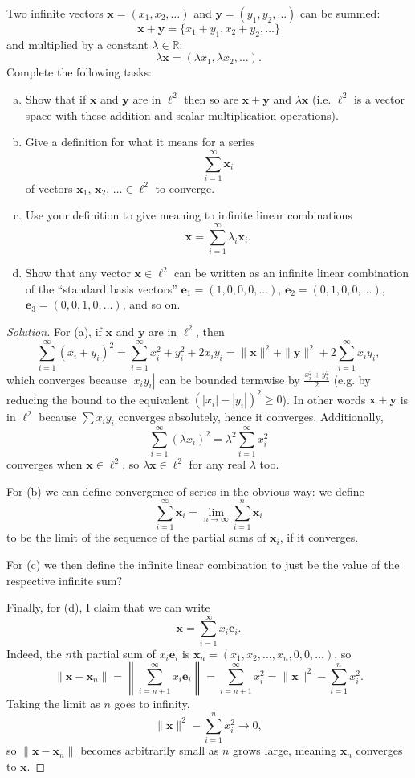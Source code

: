 \documentclass[11pt]{scrartcl}
\providecommand{\RR}{\mathbb R}
\providecommand{\ii}{\item}
\providecommand{\mb}[1]{\mathbf{#1}}
\newenvironment{soln}{\begin{proof}[Solution]}{\end{proof}}
\begin{document}
\begin{problem}
	Two infinite vectors $\mb x = (x_1, x_2, \dots)$
	and $\mb y = (y_1, y_2, \dots)$ can be summed:
	\[\mb x + \mb y = \{x_1 + y_1, x_2 + y_2, \dots\}\]
	and multiplied by a constant $\lambda\in\RR$:
	\[\lambda\mb x = (\lambda x_1, \lambda x_2, \dots).\]
	Complete the following tasks:
	\begin{enumerate}[(a)]
		\ii Show that if $\mb x$ and $\mb y$ are in $\ell^2$
		then so are $\mb x + \mb y$ and $\lambda\mb x$
		(i.e. $\ell^2$ is a vector space
		with these addition and scalar multiplication operations).
		\ii Give a definition for what it means for a series
		\[\sum_{i=1}^{\infty} \mb x_i\]
		of vectors $\mb x_1,\,\mb x_2,\,\dots\in\ell^2$ to converge.
		\ii Use your definition to give meaning to infinite linear combinations
		\[\mb x = \sum_{i=1}^\infty \lambda_i\mb x_i.\]
		\ii Show that any vector $\mb x\in\ell^2$ can be written as
		an infinite linear combination of the ``standard basis vectors''
		$\mb e_1 = (1, 0, 0, 0, \dots)$, $\mb e_2 = (0, 1, 0, 0, \dots)$,
		$\mb e_3 = (0, 0, 1, 0, \dots)$, and so on.
	\end{enumerate}
\end{problem}

\begin{soln}
	For (a), if $\mb x$ and $\mb y$ are in $\ell^2$, then
	\[\sum_{i=1}^\infty (x_i + y_i)^2 =
	\sum_{i=1}^\infty x_i^2 + y_i^2 + 2x_iy_i
	= \|\mb x\|^2 + \|\mb y\|^2 + 2\sum_{i=1}^\infty x_iy_i,\]
	which converges because $|x_iy_i|$ can be bounded termwise by
	$\frac{x_i^2 + y_i^2}{2}$ (e.g. by reducing the bound to the equivalent
	$(|x_i| - |y_i|)^2 \ge 0$).
	In other words $\mb x + \mb y$ is in $\ell^2$
	because $\sum x_iy_i$ converges absolutely, hence it converges.
	Additionally,
	\[\sum_{i=1}^\infty (\lambda x_i)^2 = \lambda^2 \sum_{i=1}^\infty x_i^2\]
	converges when $\mb x\in\ell^2$, so $\lambda\mb x\in\ell^2$
	for any real $\lambda$ too.
	
	For (b) we can define convergence of series in the obvious way:
	we define
	\[\sum_{i=1}^\infty \mb x_i = \lim_{n\to\infty}\sum_{i=1}^n \mb x_i\]
	to be the limit of the sequence of the partial sums of $\mb x_i$,
	if it converges.
	
	For (c) we then define the infinite linear combination
	to just be the value of the respective infinite sum?
	
	Finally, for (d), I claim that we can write
	\[\mb x = \sum_{i=1}^\infty x_i\mb e_i.\]
	Indeed, the $n$th partial sum of $x_i\mb e_i$ is
	$\mb x_n = (x_1, x_2, \dots, x_n, 0, 0, \dots)$, so
	\[\|\mb x - \mb x_n\| = \left\|\sum_{i=n+1}^\infty x_i\mb e_i\right\|
	= \sum_{i=n+1}^\infty x_i^2 = \|\mb x\|^2 - \sum_{i=1}^n x_i^2.\]
	Taking the limit as $n$ goes to infinity,
	\[\|\mb x\|^2 - \sum_{i=1}^n x_i^2 \to 0,\]
	so $\|\mb x - \mb x_n\|$ becomes arbitrarily small as $n$ grows large,
	meaning $\mb x_n$ converges to $\mb x$.
\end{soln}
\end{document}
